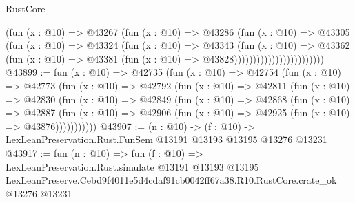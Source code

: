 \begin{lexlean}{RustCore}
\begin{coremodule}
                                    (fun (x : @10) =>
                                    @43267
                                      (fun (x : @10) =>
                                      @43286
                                        (fun (x : @10) =>
                                        @43305
                                          (fun (x : @10) =>
                                          @43324
                                            (fun (x : @10) =>
                                            @43343
                                              (fun (x : @10) =>
                                              @43362
                                                (fun (x : @10) =>
                                                @43381
                                                  (fun (x : @10) => @43828))))))))))))))))))))))))
@43899 := fun (x : @10) =>
  @42735
    (fun (x : @10) =>
    @42754
      (fun (x : @10) =>
      @42773
        (fun (x : @10) =>
        @42792
          (fun (x : @10) =>
          @42811
            (fun (x : @10) =>
            @42830
              (fun (x : @10) =>
              @42849
                (fun (x : @10) =>
                @42868
                  (fun (x : @10) =>
                  @42887
                    (fun (x : @10) =>
                    @42906 (fun (x : @10) => @42925 (fun (x : @10) => @43876)))))))))))
@43907 := (n : @10) ->
  (f : @10) -> LexLeanPreservation.Rust.FunSem @13191 @13193 @13195 @13276 @13231
@43917 := fun (n : @10) =>
  fun (f : @10) =>
  LexLeanPreservation.Rust.simulate
    @13191
    @13193
    @13195
    LexLeanPreserve.Cebd9f4011e5d4cdaf91cb0042ff67a38.R10.RustCore.crate_ok
    @13276
    @13231
\end{coremodule}
\end{lexlean}
